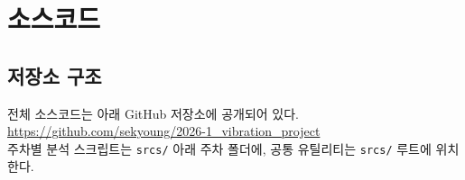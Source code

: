 \documentclass[
	a4paper, %
	10pt, %
]{CSUniSchoolLabReport}
\begin{document}

\section{소스코드}\label{sec:code}

\subsection{저장소 구조}
전체 소스코드는 아래 GitHub 저장소에 공개되어 있다.\\[4pt]
\url{https://github.com/sekyoung/2026-1_vibration_project}\\[6pt]
\noindent 주차별 분석 스크립트는 \texttt{srcs/} 아래 주차 폴더에,
공통 유틸리티는 \texttt{srcs/} 루트에 위치한다.
\end{document}
